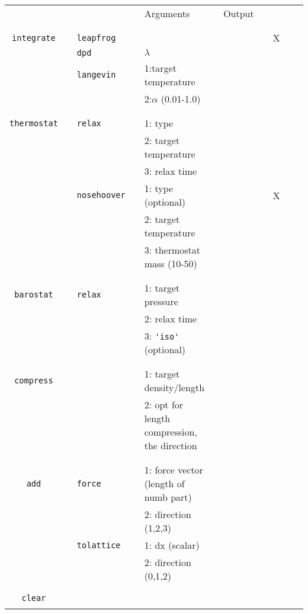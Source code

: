\documentclass[11pt]{article}
\begin{document}
\clearpage
\begin{center}
  
  \begin{tabular}{cclclclllcc}
	  {\color{red}{\textbf{Action}}} && {\color{blue}{Specifier}} && Arguments && Output && \rotatebox{90}{CUDA}\\
								   && && && && \\
    \hline
								   && && && && \\
	  \verb!integrate! && \verb!leapfrog! && && && X \\
	  $\mbox{}$ && \verb!dpd!      && $\lambda$ && && \\
	  $\mbox{}$ && \verb!langevin! && 1:target temperature && && \\ 
	  $\mbox{}$ &&                 && 2:$\alpha$ (0.01-1.0)&& &&\\
								   && && && && \\
    \hline
								   && && && && \\
	  \verb!thermostat! && \verb!relax! && 1: type && && \\
		$\mbox{}$  &&       && 2: target temperature && && \\
		$\mbox{}$  &&        && 3: relax time && && \\
	  $\mbox{}$  && \verb!nosehoover! && 1: type (optional) && && X\\
	  $\mbox{}$  &&            && 2: target temperature && && \\
	  $\mbox{}$  &&            && 3: thermostat mass (10-50)&& && \\
								   && && && && \\
    \hline
								   && && && && \\
	  \verb!barostat! && \verb!relax! && 1: target pressure && && \\
	  $\mbox{}$   &&       && 2: relax time && && \\
	  $\mbox{}$  &&        && 3: \verb!'iso'! (optional) && && \\
								   && && && && \\
    \hline
								   && && && && \\
	  \verb!compress! && && 1: target density/length && && \\
	  $\mbox{}$ &&       && 2: opt for length compression, the direction && \\
								   && && && && \\
    \hline
								   && && && && \\
	  \verb!add! && \verb!force! && 1: force vector (length of numb part) && && \\
	  $\mbox{}$   &&             && 2: direction (1,2,3) && &&\\
	  $\mbox{}$   && \verb!tolattice! && 1: dx (scalar) && && \\
	  $\mbox{}$   &&             && 2: direction (0,1,2) && && \\
								   && && && && \\
    \hline
								   && && && && \\
	  \verb!clear! & & && && &&  \\
								   && && && && \\
    \hline
 

\end{tabular}
\end{center}
\end{document}
